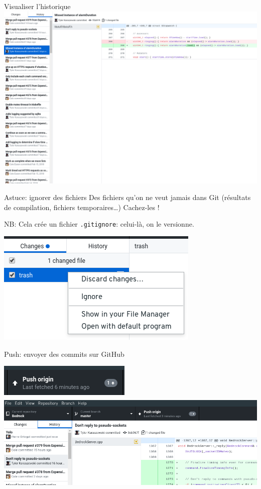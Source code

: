 \documentclass{beamer}
\begin{document}
\begin{frame}{Visualiser l'historique}
	 	   \includegraphics[scale=0.22]{img/github_desktop/historique.png}
\end{frame}

\begin{frame}{Astuce: ignorer des fichiers}
    Des fichiers qu'on ne veut jamais dans Git (résultats de compilation,
    fichiers temporaires\dots) Cachez-les !

    NB: Cela crée un fichier \texttt{.gitignore}: celui-là, on le versionne.
	\begin{center}
	 	   \includegraphics[scale=0.35]{img/github_desktop/ignore.png}
	\end{center}
\end{frame}

\begin{frame}{Push: envoyer des commits sur GitHub}
	\begin{center}
	 	   \includegraphics[scale=0.35]{img/github_desktop/push.png}\\
	 	   \includegraphics[scale=0.35]{img/github_desktop/push_2.png}
	\end{center}
\end{frame}
\end{document}
